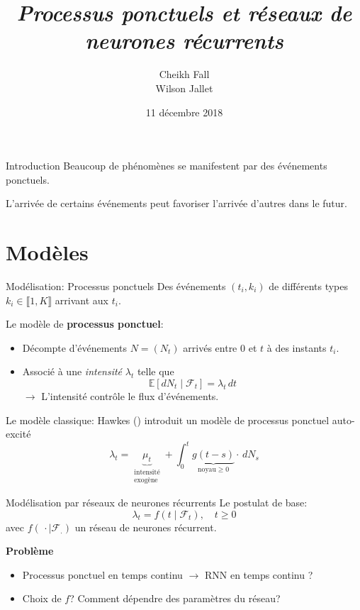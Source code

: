 \documentclass{beamer}
\title{
	\textit{Processus ponctuels et réseaux de neurones récurrents}
}
\author{
	Cheikh Fall\\
	Wilson Jallet
}
\date{11 décembre 2018}
\newcommand{\EE}{\mathbb{E}}
\begin{document}
\maketitle

\begin{frame}{Introduction}
Beaucoup de phénomènes se manifestent par des événements ponctuels.\pause

L'arrivée de certains événements peut favoriser l'arrivée d'autres dans le futur.
\end{frame}

\section{Modèles}

\begin{frame}{Modélisation: Processus ponctuels}
Des événements $(t_i, k_i)$ de différents types $k_i\in\llbracket 1, K\rrbracket$ arrivant  aux $t_i$.\pause

Le modèle de \textbf{processus ponctuel}:
\begin{itemize}
	\item[\textbullet] Décompte d'événements $N = (N_t)$ arrivés entre $0$ et $t$ à des instants $t_i$.
	\item[\textbullet] Associé à une \textit{intensité} $\lambda_t$ telle que
	\[
		\EE[dN_t\mid \mathcal{F}_t] = \lambda_t\,dt
	\]\pause
	$\rightarrow$ L'intensité contrôle le flux d'événements.
\end{itemize}

\end{frame}

\begin{frame}{Le modèle classique: Hawkes (\citeyear{hawkes1971})}
\citeauthor{hawkes1971} \cite{hawkes1971} introduit un modèle de processus ponctuel auto-excité
\begin{equation}
\lambda_t =
\underbrace{\mu_t}_{\substack{\text{intensité}\\\text{exogène}}} + \int_0^t \underbrace{g(t-s)}_{\text{noyau}\geq 0}\cdot\, dN_s
\end{equation}
\end{frame}


\begin{frame}{Modélisation par réseaux de neurones récurrents}
Le postulat de base:
\begin{equation}
\lambda_t = f(t\mid \mathcal{F}_t),\quad t \geq 0
\end{equation}
avec $f(\,\cdot \mid \mathcal{F_{.}})$ un réseau de neurones récurrent.\pause

\noindent\textbf{Problème} \begin{itemize}
	\item Processus ponctuel en temps continu $\rightarrow$ RNN en temps continu ?
	\item Choix de $f$? Comment dépendre des paramètres du réseau?
\end{itemize}

\end{frame}
\end{document}
